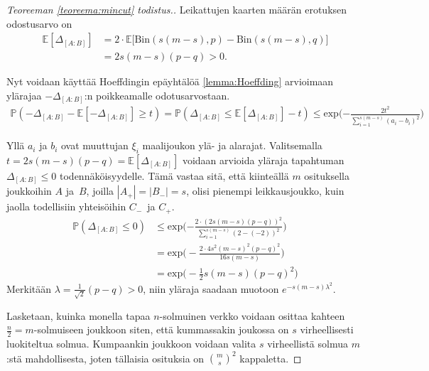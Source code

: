 \documentclass[finnish,12pt,a4paper,pdftex,sci,utf8]{aaltothesis}
\begin{document}
\begin{proof}[Teoreeman \ref{teoreema:mincut} todistus.]
Leikattujen kaarten määrän erotuksen odostusarvo on 
\begin{align*}
	\mathbb{E}[\Delta_{[A:B]}] &= 2 \cdot \mathbb{E} \big[ \text{Bin}(s(m-s), p) - \text{Bin}(s(m-s), q) \big] \\
	&= 2 s(m-s)(p-q) > 0.
\end{align*}

Nyt voidaan käyttää Hoeffdingin epäyhtälöä \ref{lemma:Hoeffding} arvioimaan ylärajaa $ -\Delta_{[A:B]}$:n poikkeamalle odotusarvostaan.
\begin{align*}
	\mathbb{P}(- \Delta_{[A:B]} - \mathbb{E}[- \Delta_{[A:B]}] \geq t) = \mathbb{P}(\Delta_{[A:B]} \leq \mathbb{E}[\Delta_{[A:B]}] - t) \leq \text{exp}\bigg({-\frac{2t^2}{\sum_{i=1}^{s(m-s)}(a_i - b_i)^2}}\bigg)
\end{align*}

Yllä $a_i$ ja $b_i$ ovat muuttujan $\xi_i$ maalijoukon ylä- ja alarajat. Valitsemalla $t = 2s(m-s)(p-q) = \mathbb{E}[\Delta_{[A:B]}]$ voidaan arvioida yläraja tapahtuman $\Delta_{[A:B]} \leq 0$ todennäköisyydelle. Tämä vastaa sitä, että kiinteällä $m$ osituksella joukkoihin $A$ ja $B$, joilla $|A_+| = |B_-| = s$, olisi pienempi leikkausjoukko, kuin jaolla todellisiin yhteisöihin $C_-$ ja $C_+$.
\begin{align*}
	\mathbb{P}(\Delta_{[A:B]} \leq 0) & \leq \text{exp}\bigg({-\frac{2 \cdot (2s(m-s)(p-q))^2}{\sum_{i=1}^{s(m-s)}(2-(-2))^2}}\bigg) \\
	&= \text{exp}\bigg(-\frac{2 \cdot 4s^2(m-s)^2(p-q)^2}{16s(m-s)}\bigg)\\
	&= \text{exp} \big(-\frac{1}{2}s(m-s)(p-q)^2 \big)
\end{align*}
Merkitään $\lambda = \frac{1}{\sqrt2}(p-q) > 0$, niin yläraja saadaan muotoon $e^{-s(m-s)\lambda^2}$.

Lasketaan, kuinka monella tapaa $n$-solmuinen verkko voidaan osittaa kahteen $\frac{n}{2} = m$-solmuiseen joukkoon siten, että kummassakin joukossa on $s$ virheellisesti luokiteltua solmua. Kumpaankin joukkoon voidaan valita $s$ virheellistä solmua $m$:stä mahdollisesta, joten tällaisia osituksia on $\binom{m}{s}^2$ kappaletta.


\end{proof}
\end{document}
